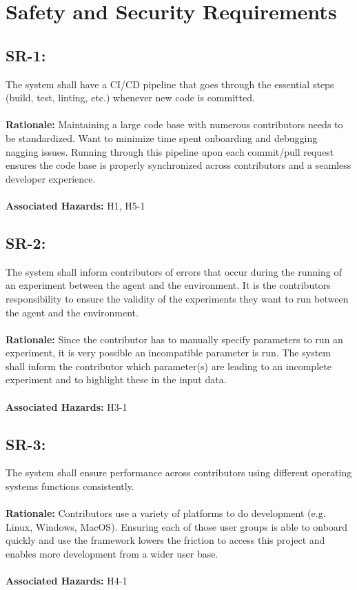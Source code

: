 \documentclass{article}
\begin{document}
\section{Safety and Security Requirements}

\subsection*{SR-1:}
The system shall have a CI/CD pipeline that goes through the essential steps (build, test, linting, etc.) whenever new code is committed. \\ \\
\textbf{Rationale:} Maintaining a large code base with numerous contributors needs to be standardized. Want to minimize time spent onboarding and debugging nagging issues. Running through this pipeline upon each commit/pull request ensures the code base is properly synchronized across contributors and a seamless developer experience. \\ \\
\textbf{Associated Hazards:} H1, H5-1

\subsection*{SR-2:}
The system shall inform contributors of errors that occur during the running of an experiment between the agent and the environment. It is the contributors responsibility to ensure the validity of the experiments they want to run between the agent and the environment. \\ \\ 
\textbf{Rationale:} Since the contributor has to manually specify parameters to run an experiment, it is very possible an incompatible parameter is run. The system shall inform the contributor which parameter(s) are leading to an incomplete experiment and to highlight these in the input data. \\ \\ 
\textbf{Associated Hazards:} H3-1

\subsection*{SR-3:}
The system shall ensure performance across contributors using different operating systems functions consistently. \\ \\
\textbf{Rationale:} Contributors use a variety of platforms to do development (e.g. Linux, Windows, MacOS). Ensuring each of those user groups is able to onboard quickly and use the framework lowers the friction to access this project and enables more development from a wider user base. \\ \\
\textbf{Associated Hazards:} H4-1
\end{document}
